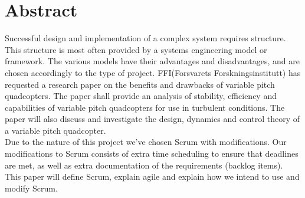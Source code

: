 \section*{Abstract}

Successful design and implementation of a complex system requires structure. This structure is most often provided by a systems engineering model or framework. The various models have their advantages and disadvantages, and are chosen accordingly to the type of project. FFI(Forsvarets Forskningsinstitutt) has requested a research paper on the benefits and drawbacks of variable pitch quadcopters. The paper shall provide an analysis of stability, efficiency and capabilities of variable pitch quadcopters for use in turbulent conditions. The paper will also discuss and investigate the design, dynamics and control theory of a variable pitch quadcopter.
\\
\newline
Due to the nature of this project we've chosen Scrum with modifications. Our modifications to Scrum consists of extra time scheduling to ensure that deadlines are met, as well as extra documentation of the requirements (backlog items).
\\
\newline
This paper will define Scrum, explain agile and explain how we intend to use and modify Scrum.




